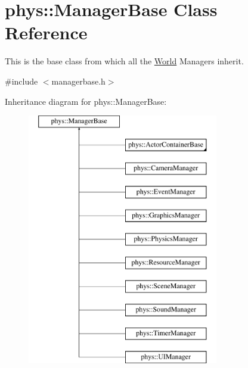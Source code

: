 \hypertarget{classphys_1_1ManagerBase}{
\section{phys::ManagerBase Class Reference}
\label{d2/de3/classphys_1_1ManagerBase}
}


This is the base class from which all the \hyperlink{classphys_1_1World}{World} Managers inherit.  




{\ttfamily \#include $<$managerbase.h$>$}

Inheritance diagram for phys::ManagerBase:\begin{figure}[H]
\begin{center}
\leavevmode
\includegraphics[height=11.000000cm]{d2/de3/classphys_1_1ManagerBase}
\end{center}
\end{figure}
